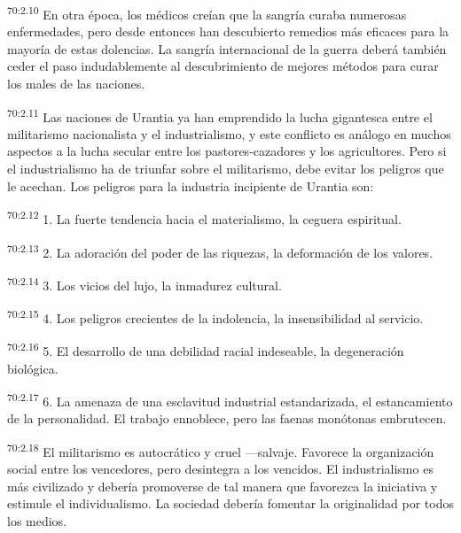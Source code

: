 \documentclass[twoside, 11pt]{book}
\begin{document}
\par
\textsuperscript{70:2.10} En otra época, los médicos creían que la sangría curaba numerosas enfermedades, pero desde entonces han descubierto remedios más eficaces para la mayoría de estas dolencias. La sangría internacional de la guerra deberá también ceder el paso indudablemente al descubrimiento de mejores métodos para curar los males de las naciones.

\par
\textsuperscript{70:2.11} Las naciones de Urantia ya han emprendido la lucha gigantesca entre el militarismo nacionalista y el industrialismo, y este conflicto es análogo en muchos aspectos a la lucha secular entre los pastores-cazadores y los agricultores. Pero si el industrialismo ha de triunfar sobre el militarismo, debe evitar los peligros que le acechan. Los peligros para la industria incipiente de Urantia son:

\par
\textsuperscript{70:2.12} 1. La fuerte tendencia hacia el materialismo, la ceguera espiritual.

\par
\textsuperscript{70:2.13} 2. La adoración del poder de las riquezas, la deformación de los valores.

\par
\textsuperscript{70:2.14} 3. Los vicios del lujo, la inmadurez cultural.

\par
\textsuperscript{70:2.15} 4. Los peligros crecientes de la indolencia, la insensibilidad al servicio.

\par
\textsuperscript{70:2.16} 5. El desarrollo de una debilidad racial indeseable, la degeneración biológica.

\par
\textsuperscript{70:2.17} 6. La amenaza de una esclavitud industrial estandarizada, el estancamiento de la personalidad. El trabajo ennoblece, pero las faenas monótonas embrutecen.

\par
\textsuperscript{70:2.18} El militarismo es autocrático y cruel ---salvaje. Favorece la organización social entre los vencedores, pero desintegra a los vencidos. El industrialismo es más civilizado y debería promoverse de tal manera que favorezca la iniciativa y estimule el individualismo. La sociedad debería fomentar la originalidad por todos los medios.
\end{document}
